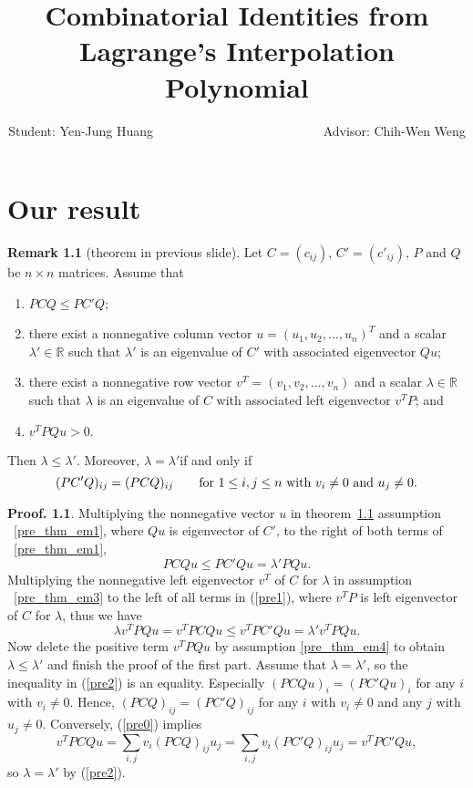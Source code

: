 \documentclass[12pt]{report}
\title{Combinatorial Identities from Lagrange's Interpolation Polynomial}
\author{Student: Yen-Jung Huang  ~~~~~~~~~~~~~~~~~~~~~~~~~~Advisor: Chih-Wen Weng}
\date{} %
\theoremstyle{plain}
\theoremstyle{definition}
\newtheorem{rem}[thm]{Remark}
\newtheorem{pof}[thm]{Proof.}
\begin{document}
\chapter{Our result}

\begin{rem}[theorem in previous slide]\label{pre_thm}
  Let $C=(c_{ij})$, $C'=(c'_{ij})$, $P$ and $Q$ be  $n\times n$ matrices.
Assume that
\begin{enumerate}[label=(\roman*)]
  \item \label{pre_thm_em1}  $PCQ\leq PC'Q$;   %
  \item \label{pre_thm_em2}  there exist a nonnegative column vector $u=(u_1, u_2, \ldots, u_n)^T$  and a
  scalar $\lambda'\in \mathbb{R}$ such that $\lambda'$ is an eigenvalue of $C'$ with
  associated eigenvector $Qu$;
  \item \label{pre_thm_em3}  there exist a nonnegative row vector $v^T=(v_1, v_2, \ldots, v_n)$  and a scalar
  $\lambda\in \mathbb{R}$such that $\lambda$ is an eigenvalue of $C$ with associated  left
  eigenvector $v^TP$; and
  \item \label{pre_thm_em4} $v^TPQu>0.$
\end{enumerate}
  Then $\lambda\leq \lambda'$. Moreover, $\lambda=\lambda'$if and only if
  \begin{equation}\label{pre0}
      (PC'Q)_{ij}=(PCQ)_{ij}\qquad \hbox{for~}1\leq i, j\leq n \hbox{~with~} v_i\ne 0 \hbox{~and~} u_j\ne 0.
  \end{equation}
\end{rem}



\begin{pof}
  Multiplying the nonnegative vector $u$ in theorem~\ref{pre_thm} assumption
  ~\ref{pre_thm_em1}, where $Qu$ is eigenvector of $C'$,  to the right of both terms of
  ~\ref{pre_thm_em1},
  \begin{equation}\label{pre1}
      PCQu\leq PC'Qu=\lambda'PQu.
  \end{equation}
  Multiplying the nonnegative left eigenvector $v^T$ of $C$ for $\lambda$ in assumption
  ~\ref{pre_thm_em3} to the left of all terms  in (\ref{pre1}), where $v^TP$ is
  left eigenvector of $C$ for $\lambda$, thus we have
  \begin{equation}\label{pre2}
      \lambda v^TPQu=v^TPCQu\leq v^TPC'Qu=\lambda' v^TPQu.
  \end{equation}
      Now delete the positive term $v^TPQu$ by assumption \ref{pre_thm_em4} to obtain
       $\lambda\leq \lambda'$ and finish the proof of the first part.
  Assume that $\lambda=\lambda'$, so the inequality in (\ref{pre2}) is an equality.
  Especially $(PCQu)_i=(PC'Qu)_i$ for any $i$ with $v_i\not=0.$ Hence,
  $(PCQ)_{ij}=(PC'Q)_{ij}$ for any $i$ with $v_i\not=0$ and any $j$ with
  $u_j\not=0.$ Conversely, (\ref{pre0}) implies $$v^TPCQu=\sum_{i,j} v_i(PCQ)_{ij}u_j=
  \sum_{i,j} v_i(PC'Q)_{ij}u_j=v^TPC'Qu,$$ so $\lambda=\lambda'$ by (\ref{pre2}).

\end{pof}
\end{document}
